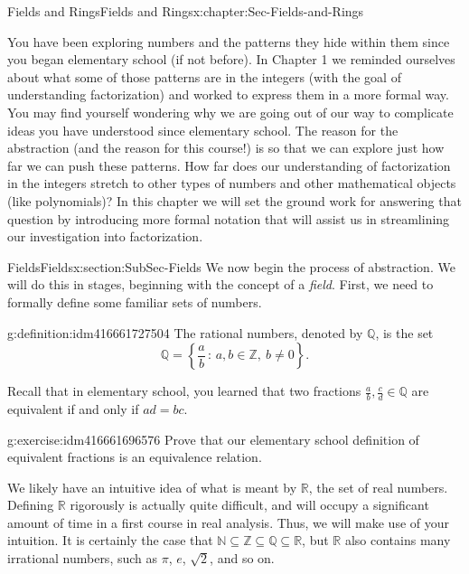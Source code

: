 \documentclass[oneside,10pt,]{book}
\numberwithin{equation}{section}
\newcommand{\setof}[2]{{\left\{#1\,\colon\,#2\right\}}}
\def\Z{{\mathbb Z}}
\def\Q{{\mathbb Q}}
\def\N{{\mathbb N}}
\def\R{{\mathbb R}}
\begin{document}
\begin{chapterptx}{Fields and Rings}{}{Fields and Rings}{}{}{x:chapter:Sec-Fields-and-Rings}
\begin{introduction}{}%
You have been exploring numbers and the patterns they hide within them since you began elementary school (if not before). In Chapter 1 we reminded ourselves about what some of those patterns are in the integers (with the goal of understanding factorization) and worked to express them in a more formal way. You may find yourself wondering why we are going out of our way to complicate ideas you have understood since elementary school. The reason for the abstraction (and the reason for this course!) is so that we can explore just how far we can push these patterns. How far does our understanding of factorization in the integers stretch to other types of numbers and other mathematical objects (like polynomials)? In this chapter we will set the ground work for answering that question by introducing more formal notation that will assist us in streamlining our investigation into factorization.%
\end{introduction}%
%
%
\typeout{************************************************}
\typeout{************************************************}
%
\begin{sectionptx}{Fields}{}{Fields}{}{}{x:section:SubSec-Fields}
We now begin the process of abstraction. We will do this in stages, beginning with the concept of a \emph{field}. First, we need to formally define some familiar sets of numbers.%
\begin{definition}{}{g:definition:idm416661727504}%
The rational numbers, denoted by \(\Q\), is the set%
\begin{equation*}
\Q = \setof{\frac{a}{b}}{a,b\in \Z, \ b\ne 0}\text{.}
\end{equation*}
%
\end{definition}
Recall that in elementary school, you learned that two fractions \(\frac{a}{b}, \frac{c}{d} \in \Q\) are equivalent if and only if \(ad=bc\).%
\begin{inlineexercise}{}{g:exercise:idm416661696576}%
Prove that our elementary school definition of equivalent fractions is an equivalence relation.%
\end{inlineexercise}
We likely have an intuitive idea of what is meant by \(\R\), the set of real numbers. Defining \(\R\) rigorously is actually quite difficult, and will occupy a significant amount of time in a first course in real analysis. Thus, we will make use of your intuition. It is certainly the case that \(\N\subseteq \Z\subseteq \Q\subseteq \R\), but \(\R\) also contains many irrational numbers, such as \(\pi\), \(e\), \(\sqrt{2}\), and so on.%

\end{sectionptx}
\end{chapterptx}
\end{document}
